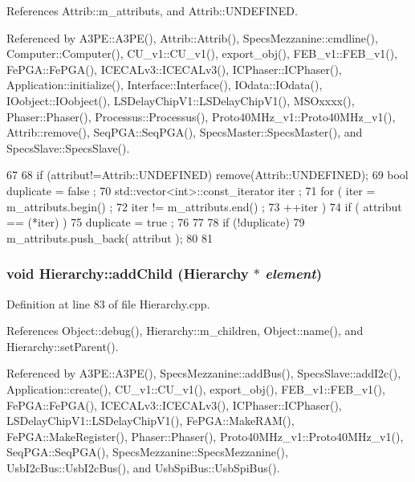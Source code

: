 References Attrib::m\_\-attributs, and Attrib::UNDEFINED.

Referenced by A3PE::A3PE(), Attrib::Attrib(), SpecsMezzanine::cmdline(), Computer::Computer(), CU\_\-v1::CU\_\-v1(), export\_\-obj(), FEB\_\-v1::FEB\_\-v1(), FePGA::FePGA(), ICECALv3::ICECALv3(), ICPhaser::ICPhaser(), Application::initialize(), Interface::Interface(), IOdata::IOdata(), IOobject::IOobject(), LSDelayChipV1::LSDelayChipV1(), MSOxxxx(), Phaser::Phaser(), Processus::Processus(), Proto40MHz\_\-v1::Proto40MHz\_\-v1(), Attrib::remove(), SeqPGA::SeqPGA(), SpecsMaster::SpecsMaster(), and SpecsSlave::SpecsSlave().


\begin{DoxyCode}
67                             {
68     if (attribut!=Attrib::UNDEFINED) remove(Attrib::UNDEFINED);
69     bool duplicate = false ;
70     std::vector<int>::const_iterator iter ;
71     for ( iter  = m_attributs.begin() ;
72           iter != m_attributs.end()   ;
73           ++iter ) {
74       if ( attribut == (*iter) ) {
75         duplicate = true ;
76       }
77     }
78     if (!duplicate) {
79       m_attributs.push_back( attribut );
80     }
81   }
\end{DoxyCode}
\hypertarget{classHierarchy_ad677774ff38fcb257c04a3a10d471fac}{
\subsubsection[{addChild}]{\setlength{\rightskip}{0pt plus 5cm}void Hierarchy::addChild ({\bf Hierarchy} $\ast$ {\em element})}}
\label{classHierarchy_ad677774ff38fcb257c04a3a10d471fac}


Definition at line 83 of file Hierarchy.cpp.

References Object::debug(), Hierarchy::m\_\-children, Object::name(), and Hierarchy::setParent().

Referenced by A3PE::A3PE(), SpecsMezzanine::addBus(), SpecsSlave::addI2c(), Application::create(), CU\_\-v1::CU\_\-v1(), export\_\-obj(), FEB\_\-v1::FEB\_\-v1(), FePGA::FePGA(), ICECALv3::ICECALv3(), ICPhaser::ICPhaser(), LSDelayChipV1::LSDelayChipV1(), FePGA::MakeRAM(), FePGA::MakeRegister(), Phaser::Phaser(), Proto40MHz\_\-v1::Proto40MHz\_\-v1(), SeqPGA::SeqPGA(), SpecsMezzanine::SpecsMezzanine(), UsbI2cBus::UsbI2cBus(), and UsbSpiBus::UsbSpiBus().


